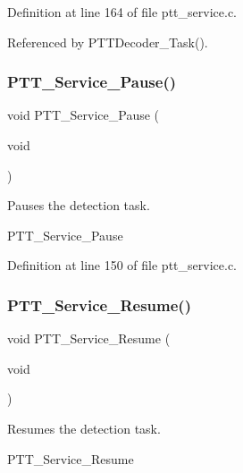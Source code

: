 Definition at line 164 of file ptt\+\_\+service.\+c.



Referenced by P\+T\+T\+Decoder\+\_\+\+Task().

\mbox{\label{group___p_t_t___service_gadb31aa6a2786f09d8d313976c2bb5da4}} 
\subsubsection{\texorpdfstring{P\+T\+T\+\_\+\+Service\+\_\+\+Pause()}{PTT\_Service\_Pause()}}
{\footnotesize\ttfamily void P\+T\+T\+\_\+\+Service\+\_\+\+Pause (\begin{DoxyParamCaption}\item[{void}]{ }\end{DoxyParamCaption})}



Pauses the detection task. 

P\+T\+T\+\_\+\+Service\+\_\+\+Pause 

Definition at line 150 of file ptt\+\_\+service.\+c.

\mbox{\label{group___p_t_t___service_ga2e11314e3f3a76f495368ea6d3eda678}} 
\subsubsection{\texorpdfstring{P\+T\+T\+\_\+\+Service\+\_\+\+Resume()}{PTT\_Service\_Resume()}}
{\footnotesize\ttfamily void P\+T\+T\+\_\+\+Service\+\_\+\+Resume (\begin{DoxyParamCaption}\item[{void}]{ }\end{DoxyParamCaption})}



Resumes the detection task. 

P\+T\+T\+\_\+\+Service\+\_\+\+Resume 

